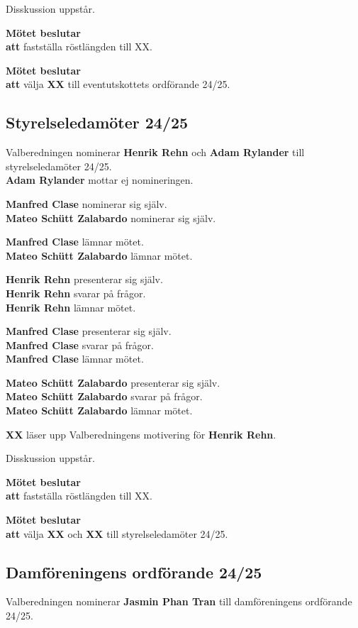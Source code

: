 \documentclass{datateknologsektionen-document}
\newcommand{\ind}{\hspace*{2em}}
\newcommand{\motetbeslutar}{\textbf{Mötet beslutar}}
\newcommand{\att}{\\\ind\textbf{att}}
\begin{document}
Disskussion uppstår.

\motetbeslutar
\att{} fastställa röstlängden till XX.

\motetbeslutar
\att{} välja \textbf{XX} till eventutskottets ordförande 24/25.

\subsection{Styrelseledamöter 24/25}

Valberedningen nominerar \textbf{Henrik Rehn} och \textbf{Adam Rylander} till styrelseledamöter 24/25. \\
\textbf{Adam Rylander} mottar ej nomineringen.

\textbf{Manfred Clase} nominerar sig själv. \\
\textbf{Mateo Schütt Zalabardo} nominerar sig själv. 

\textbf{Manfred Clase} lämnar mötet. \\
\textbf{Mateo Schütt Zalabardo} lämnar mötet.

\textbf{Henrik Rehn} presenterar sig själv.\\
\textbf{Henrik Rehn} svarar på frågor.\\
\textbf{Henrik Rehn} lämnar mötet.

\textbf{Manfred Clase} presenterar sig själv.\\
\textbf{Manfred Clase} svarar på frågor.\\
\textbf{Manfred Clase} lämnar mötet.

\textbf{Mateo Schütt Zalabardo} presenterar sig själv.\\
\textbf{Mateo Schütt Zalabardo} svarar på frågor.\\
\textbf{Mateo Schütt Zalabardo} lämnar mötet.

\textbf{XX} läser upp Valberedningens motivering för \textbf{Henrik Rehn}.

Disskussion uppstår.

\motetbeslutar
\att{} fastställa röstlängden till XX.

\motetbeslutar
\att{} välja \textbf{XX} och \textbf{XX} till styrelseledamöter 24/25.

\subsection{Damföreningens ordförande 24/25}

Valberedningen nominerar \textbf{Jasmin Phan Tran} till damföreningens ordförande 24/25.
\end{document}
